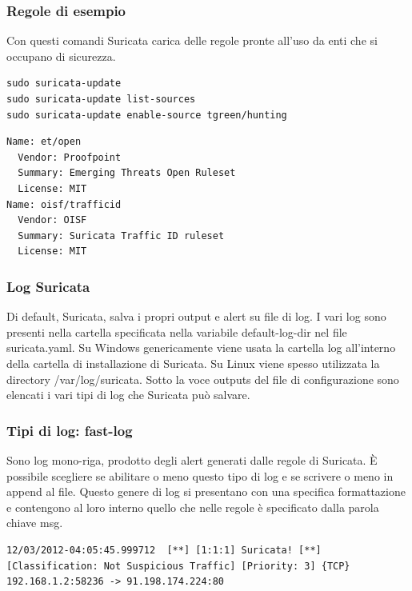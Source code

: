 \documentclass[aspectratio=169]{beamer}
\renewcommand\texttt[1]{{\ttfamily\color{red2}#1}}
\begin{document}
    \begin{frame}[fragile]
        \frametitle{Regole di esempio}
        Con questi comandi Suricata carica delle regole pronte all'uso da enti che si occupano di sicurezza.
        \vskip 0.3cm
        \begin{lstlisting}
sudo suricata-update
sudo suricata-update list-sources
sudo suricata-update enable-source tgreen/hunting
        \end{lstlisting}
        \vskip 0.3cm
        \begin{lstlisting}
Name: et/open
  Vendor: Proofpoint
  Summary: Emerging Threats Open Ruleset
  License: MIT
Name: oisf/trafficid
  Vendor: OISF
  Summary: Suricata Traffic ID ruleset
  License: MIT
        \end{lstlisting}
    \end{frame}
    
    \begin{frame}
      \frametitle{Log Suricata}%
        Di default, Suricata, salva i propri output e alert su file di log. I vari log sono presenti nella cartella specificata nella variabile \texttt{default-log-dir} nel file \texttt{suricata.yaml}. 
        \vskip 0.3cm
        Su Windows genericamente viene usata la cartella \texttt{log} all'interno
        della cartella di installazione di Suricata. Su Linux viene spesso utilizzata la directory \texttt{/var/log/suricata}.
        \vskip 0.3cm
        Sotto la voce \texttt{outputs} del file di configurazione sono elencati i vari tipi di log che Suricata può salvare.
    \end{frame}
    
    \begin{frame}[fragile]
      \frametitle{Tipi di log: fast-log}%
        Sono log mono-riga, prodotto degli alert generati dalle regole di Suricata. È possibile scegliere se abilitare o meno questo tipo di log e se scrivere o meno in append al file. Questo genere di log si presentano con una specifica formattazione e contengono al loro interno quello che nelle regole è specificato dalla parola chiave \texttt{msg}.
        \vskip 0.3cm
        \begin{lstlisting}
12/03/2012-04:05:45.999712  [**] [1:1:1] Suricata! [**]
[Classification: Not Suspicious Traffic] [Priority: 3] {TCP}
192.168.1.2:58236 -> 91.198.174.224:80
        \end{lstlisting}
    \end{frame}
    
\end{document}
